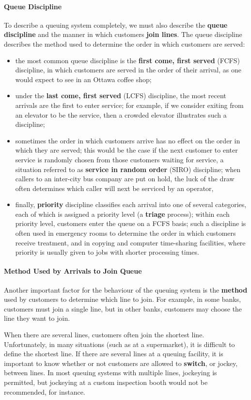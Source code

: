 \paragraph{Queue Discipline}
To describe a queuing system completely, we must also describe the \textbf{queue discipline} and the manner in which customers \textbf{join lines}. The queue discipline describes the method used to determine the order in which customers are served: 
\begin{itemize}[noitemsep]
\item the most common queue discipline is the \textbf{first come, first served} (FCFS) discipline, in which customers are served in the order of their arrival, as one would expect to see in an Ottawa coffee shop;
\item under the \textbf{last come, first served} (LCFS) discipline, the most recent arrivals are the first to enter service; for example, if we consider exiting from an elevator to be the service, then a crowded elevator illustrates such a discipline;
\item sometimes the order in which customers arrive has no effect on the order in which they are served; this would be the case if the next customer to enter service is randomly chosen from those customers waiting for service, a situation referred to as \textbf{service in random order} (SIRO) discipline; when callers to an inter-city bus company are put on hold, the luck of the draw often determines which caller will next be serviced by an operator, 
\item finally, \textbf{priority} discipline classifies each arrival into one of several categories, each of which is assigned a priority level (a \textbf{triage} process); within each priority level, customers enter the queue on a FCFS basis; such a discipline is often used in emergency rooms to determine the order in which customers receive treatment, and in copying and computer time-sharing facilities, where priority is usually given to jobs with shorter processing times.
\end{itemize}

\paragraph{Method Used by Arrivals to Join Queue}
Another important factor for the behaviour of the queuing system is the \textbf{method} used by customers to determine which line to join. For example, in some banks, customers must join a single line, but in other banks, customers may choose the line they want to join. \par  When there are several lines, customers often join the shortest line. Unfortunately, in many situations (such as at a supermarket), it is difficult to define the shortest line. If there are several lines at a queuing facility, it is important to know whether or not customers are allowed to \textbf{switch}, or jockey, between lines. In most queuing systems with multiple lines, jockeying
is permitted, but jockeying at a custom inspection booth would not be recommended, for instance. 

